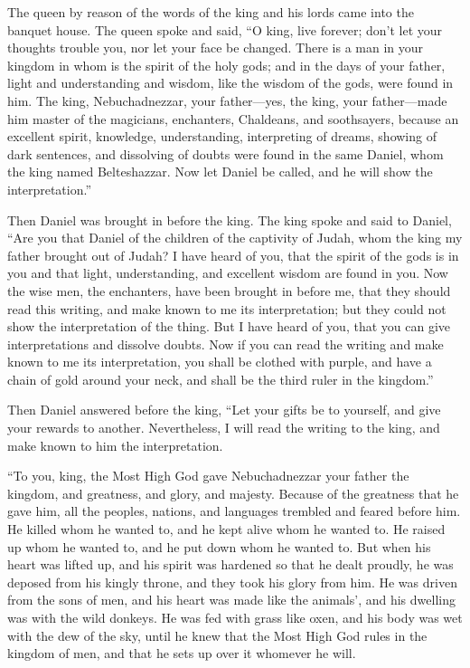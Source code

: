  The queen by reason of the words of the king and his
lords came into the banquet house. The queen spoke and said, ``O king,
live forever; don't let your thoughts trouble you, nor let your face be
changed.  There is a man in your kingdom in whom is the
spirit of the holy gods; and in the days of your father, light and
understanding and wisdom, like the wisdom of the gods, were found in
him. The king, Nebuchadnezzar, your father---yes, the king, your
father---made him master of the magicians, enchanters, Chaldeans, and
soothsayers,  because an excellent spirit, knowledge,
understanding, interpreting of dreams, showing of dark sentences, and
dissolving of doubts were found in the same Daniel, whom the king named
Belteshazzar. Now let Daniel be called, and he will show the
interpretation.''

 Then Daniel was brought in before the king. The king
spoke and said to Daniel, ``Are you that Daniel of the children of the
captivity of Judah, whom the king my father brought out of Judah?
 I have heard of you, that the spirit of the gods is in
you and that light, understanding, and excellent wisdom are found in
you.  Now the wise men, the enchanters, have been brought
in before me, that they should read this writing, and make known to me
its interpretation; but they could not show the interpretation of the
thing.  But I have heard of you, that you can give
interpretations and dissolve doubts. Now if you can read the writing and
make known to me its interpretation, you shall be clothed with purple,
and have a chain of gold around your neck, and shall be the third ruler
in the kingdom.''

 Then Daniel answered before the king, ``Let your gifts
be to yourself, and give your rewards to another. Nevertheless, I will
read the writing to the king, and make known to him the interpretation.

 ``To you, king, the Most High God gave Nebuchadnezzar
your father the kingdom, and greatness, and glory, and majesty.
 Because of the greatness that he gave him, all the
peoples, nations, and languages trembled and feared before him. He
killed whom he wanted to, and he kept alive whom he wanted to. He raised
up whom he wanted to, and he put down whom he wanted to. 
But when his heart was lifted up, and his spirit was hardened so that he
dealt proudly, he was deposed from his kingly throne, and they took his
glory from him.  He was driven from the sons of men, and
his heart was made like the animals', and his dwelling was with the wild
donkeys. He was fed with grass like oxen, and his body was wet with the
dew of the sky, until he knew that the Most High God rules in the
kingdom of men, and that he sets up over it whomever he will.

